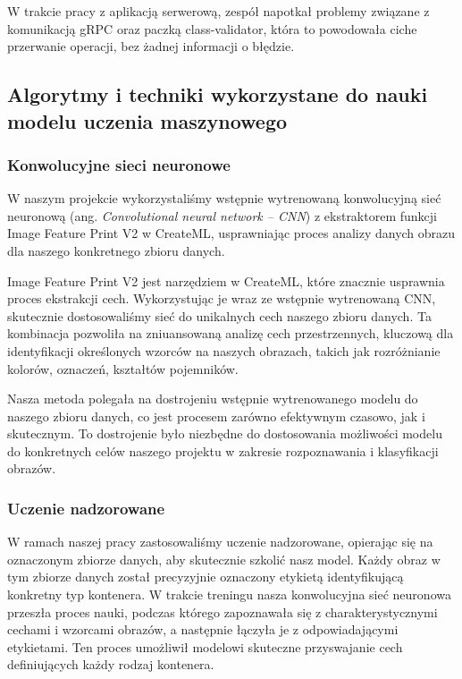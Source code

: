 \documentclass[12pt, a4paper, twoside, openany]{book}
\newcommand{\forceindent}{\leavevmode{\parindent=1.3em\indent}}
\begin{document}
{W trakcie pracy z aplikacją serwerową, zespół napotkał problemy związane z komunikacją gRPC oraz paczką class-validator, która to powodowała ciche przerwanie operacji, bez żadnej informacji o błędzie.
\subsection{Algorytmy i techniki wykorzystane do nauki modelu uczenia maszynowego}

\subsubsection{Konwolucyjne sieci neuronowe}
\forceindent W naszym projekcie wykorzystaliśmy wstępnie wytrenowaną konwolucyjną sieć neuronową (ang. \textit{Convolutional neural network -- CNN}) z ekstraktorem funkcji Image Feature Print V2 w CreateML, usprawniając proces analizy danych obrazu dla naszego konkretnego zbioru danych.

Image Feature Print V2 jest narzędziem w CreateML, które znacznie usprawnia proces ekstrakcji cech. Wykorzystując je wraz ze wstępnie wytrenowaną CNN, skutecznie dostosowaliśmy sieć do unikalnych cech naszego zbioru danych. Ta kombinacja pozwoliła na zniuansowaną analizę cech przestrzennych, kluczową dla identyfikacji określonych wzorców na naszych obrazach, takich jak rozróżnianie kolorów, oznaczeń, kształtów pojemników.

Nasza metoda polegała na dostrojeniu wstępnie wytrenowanego modelu do naszego zbioru danych, co jest procesem zarówno efektywnym czasowo, jak i skutecznym. To dostrojenie było niezbędne do dostosowania możliwości modelu do konkretnych celów naszego projektu w zakresie rozpoznawania i klasyfikacji obrazów.

\subsubsection{Uczenie nadzorowane}
\forceindent W ramach naszej pracy zastosowaliśmy uczenie nadzorowane, opierając się na oznaczonym zbiorze danych, aby skutecznie szkolić nasz model. Każdy obraz w tym zbiorze danych został precyzyjnie oznaczony etykietą identyfikującą konkretny typ kontenera. W trakcie treningu nasza konwolucyjna sieć neuronowa przeszła proces nauki, podczas którego zapoznawała się z charakterystycznymi cechami i wzorcami obrazów, a następnie łączyła je z odpowiadającymi etykietami. Ten proces umożliwił modelowi skuteczne przyswajanie cech definiujących każdy rodzaj kontenera.

}
\end{document}
